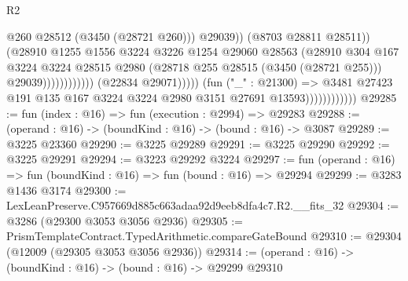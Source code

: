 \begin{lexlean}{R2}
\begin{coremodule}
                                                              @260
                                                              @28512
                                                              (@3450 (@28721 @260)))
                                                            @29039))
                                                        (@8703 @28811 @28511))
                                                      (@28910
                                                        @1255
                                                        @1556
                                                        @3224
                                                        @3226
                                                        @1254
                                                        @29060
                                                        @28563
                                                        (@28910
                                                          @304
                                                          @167
                                                          @3224
                                                          @3224
                                                          @28515
                                                          @2980
                                                          (@28718 @255 @28515 (@3450 (@28721 @255)))
                                                          @29039))))))))))))
                                  (@22834 @29071)))))
                          (fun ("_" : @21300) =>
                          @3481
                            @27423
                            @191
                            @135
                            @167
                            @3224
                            @3224
                            @2980
                            @3151
                            @27691
                            @13593))))))))))))
@29285 := fun (index : @16) => fun (execution : @2994) => @29283
@29288 := (operand : @16) -> (boundKind : @16) -> (bound : @16) -> @3087
@29289 := @3225 @23360
@29290 := @3225 @29289
@29291 := @3225 @29290
@29292 := @3225 @29291
@29294 := @3223 @29292 @3224
@29297 := fun (operand : @16) => fun (boundKind : @16) => fun (bound : @16) => @29294
@29299 := @3283 @1436 @3174
@29300 := LexLeanPreserve.C957669d885c663adaa92d9eeb8dfa4c7.R2.__fits_32
@29304 := @3286 (@29300 @3053 @3056 @2936)
@29305 := PrismTemplateContract.TypedArithmetic.compareGateBound
@29310 := @29304 (@12009 (@29305 @3053 @3056 @2936))
@29314 := (operand : @16) -> (boundKind : @16) -> (bound : @16) -> @29299 @29310

\end{coremodule}
\end{lexlean}
